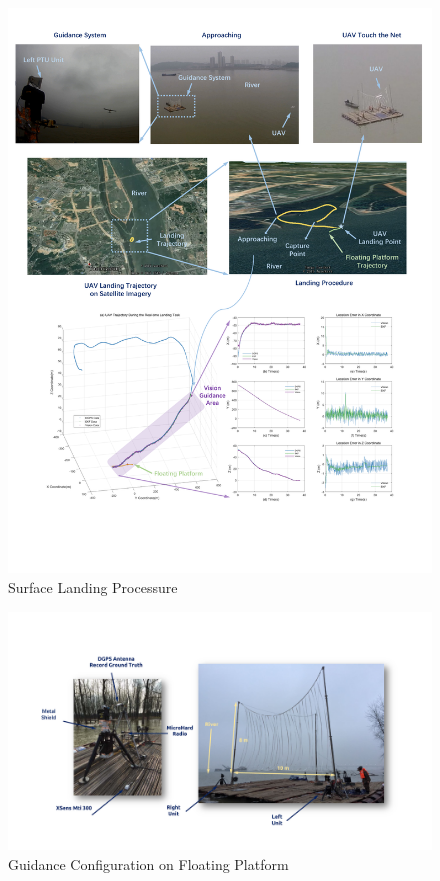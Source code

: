 \begin{figure}[!t]
	\centering
	\includegraphics[width=\textwidth]{Figs/chp08_21_river_landing.pdf}	
	\caption{Surface Landing Processure}
	\label{fig:chp08_21_river_landing}
\end{figure}


\begin{figure}[!ht]
	\centering
	\includegraphics[width=\textwidth]{Figs/chp08_16_ship_ptus.pdf}	
	\caption{Guidance Configuration on Floating Platform}
	\label{fig:chp08_16_ship_ptus}
\end{figure}



